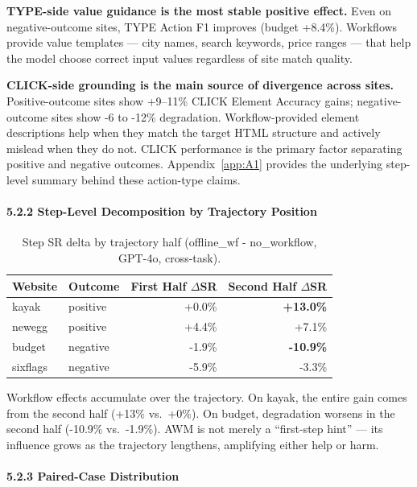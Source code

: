 \documentclass{article}
\begin{document}
\textbf{TYPE-side value guidance is the most stable positive effect.}
Even on negative-outcome sites, TYPE Action F1 improves (budget +8.4\%).
Workflows provide value templates --- city names, search keywords, price
ranges --- that help the model choose correct input values regardless of
site match quality.

\textbf{CLICK-side grounding is the main source of divergence across
sites.} Positive-outcome sites show +9--11\% CLICK Element
Accuracy gains; negative-outcome sites show -6 to -12\% degradation.
Workflow-provided element descriptions help when they match the target
HTML structure and actively mislead when they do not. CLICK performance
is the primary factor separating positive and negative outcomes.
Appendix~\ref{app:A1} provides the underlying step-level summary behind
these action-type claims.

\paragraph{5.2.2 Step-Level Decomposition by Trajectory
Position}\label{step-level-decomposition-by-trajectory-position}

{\begin{longtable}[]{@{}llrr@{}}
\caption{Step SR delta by trajectory half (offline\_wf - no\_workflow, GPT-4o, cross-task).}\label{tab:step-sr-delta-by-trajectory-half-offline-wf-n}\\

\toprule\noalign{}
Website & Outcome & First Half \ensuremath{\Delta}SR & Second Half \ensuremath{\Delta}SR \\
\midrule\noalign{}
\endhead
\bottomrule\noalign{}
\endlastfoot
kayak & positive & +0.0\% & \textbf{+13.0\%} \\
newegg & positive & +4.4\% & +7.1\% \\
budget & negative & -1.9\% & \textbf{-10.9\%} \\
sixflags & negative & -5.9\% & -3.3\% \\
\end{longtable}
}

Workflow effects accumulate over the trajectory. On kayak, the entire
gain comes from the second half (+13\% vs.~+0\%). On budget, degradation
worsens in the second half (-10.9\% vs.~-1.9\%). AWM is not merely a
``first-step hint'' --- its influence grows as the trajectory lengthens,
amplifying either help or harm.

\paragraph{5.2.3 Paired-Case
Distribution}\label{paired-case-distribution}
\end{document}
